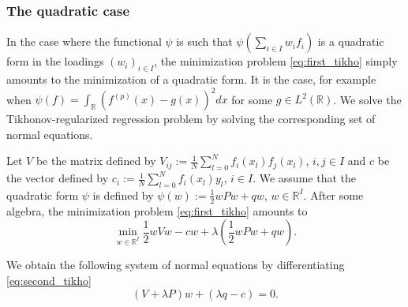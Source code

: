 \documentclass[a4paper]{article}
\newcommand{\1}{\textbf{1}}
\newcommand{\R}{\mathbb{R}}
\begin{document}
\subsubsection*{The quadratic case}
\par \noindent In the case where the functional $\psi$ is such that $\psi\left(\sum\limits_{i \in I} w_i f_i \right)$ is a quadratic form in the loadings $(w_i)_{i \in I}$, the minimization problem \eqref{eq:first_tikho} simply amounts to the minimization of a quadratic form. It is the case, for example when $\psi(f) = \int_\R (f^{(p)}(x) - g(x))^2 dx$ for some $g \in L^2(\R)$. We solve the Tikhonov-regularized regression problem by solving the corresponding set of normal equations. 
\par Let $V$ be the matrix defined by $V_{ij} := \frac{1}{N} \sum\limits_{l = 0}^N f_i(x_l) f_j(x_l)$, $i,j \in I$ and $c$ be the vector defined by $c_i := \frac{1}{N} \sum\limits_{l = 0}^N f_i(x_l) y_l$, $i \in I$. We assume that the quadratic form $\psi$ is defined by $\psi(w) := \frac{1}{2} w P w + q w$, $w \in \R^I$. After some algebra, the minimization problem \eqref{eq:first_tikho} amounts to
\begin{equation}\label{eq:second_tikho}
\min\limits_{w \in \R^I} \frac{1}{2} w V w - c w + \lambda \left(\frac{1}{2} w P w + q w \right).
\end{equation}
\par \noindent We obtain the following system of normal equations by differentiating \eqref{eq:second_tikho}
\begin{equation}
(V + \lambda P) w + (\lambda q - c) = 0.
\end{equation}
\end{document}
